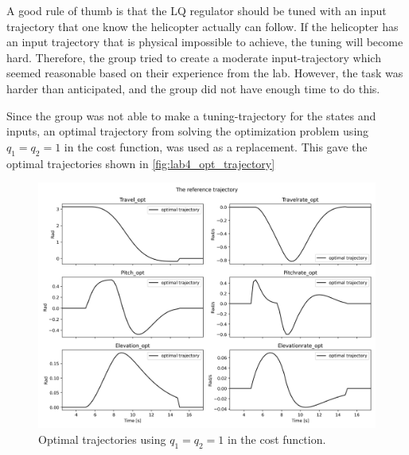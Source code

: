 \documentclass[../main.tex]{subfiles}
\begin{document}
A good rule of thumb is that the LQ regulator should be tuned with an input trajectory that one know the helicopter actually can follow. If the helicopter has an input trajectory that is physical impossible to achieve, the tuning will become hard. Therefore, the group tried to create a moderate input-trajectory which seemed reasonable based on their experience from the lab. However, the task was harder than anticipated, and the group did not have enough time to do this. 

Since the group was not able to make a tuning-trajectory for the states and inputs, an optimal trajectory from solving the optimization problem using $q_1 = q_2 = 1$ in the cost function, was used as a replacement. This gave the optimal trajectories shown in \cref{fig:lab4_opt_trajectory}

\begin{figure}[h]
	\centering
	\includegraphics[width=\linewidth]{figures/LAB4_reference_trajectory.png}
	\caption{Optimal trajectories using  $q_1 = q_2 = 1$ in the cost function.}
\end{figure}
\end{document}
